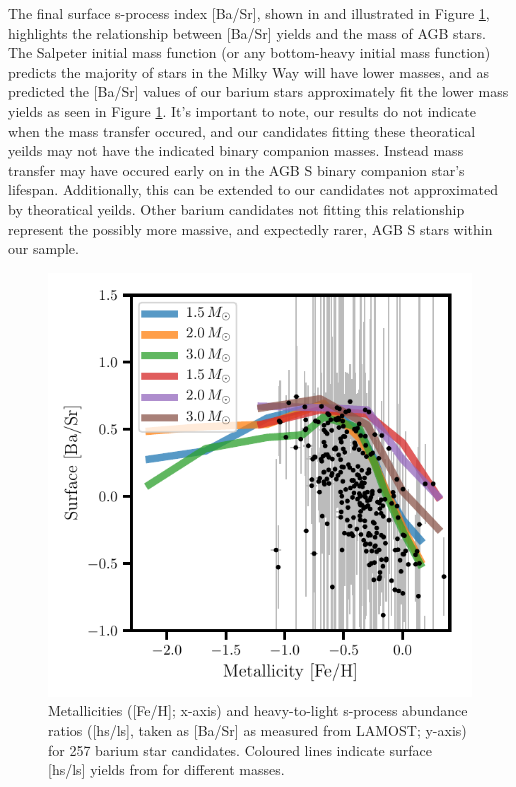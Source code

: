 \documentclass[a4paper,fleqn,usenatbib]{mnras}
\begin{document}
The final surface s-process index [Ba/Sr], shown in \citet{cristallo2015} and \citet{karakas} illustrated in Figure \ref{fig:figure3}, highlights the relationship between [Ba/Sr] yields and the mass of AGB stars. The Salpeter initial mass function (or any bottom-heavy initial mass function) predicts the majority of stars in the Milky Way will have lower masses, and as predicted the [Ba/Sr] values of our barium stars approximately fit the lower mass yields as seen in Figure \ref{fig:figure3}. It's important to note, our results do not indicate when the mass transfer occured, and our candidates fitting these theoratical yeilds may not have the indicated binary companion masses. Instead mass transfer may have occured early on in the AGB S binary companion star's lifespan. Additionally, this can be extended to our candidates not approximated by theoratical yeilds. Other barium candidates not fitting this relationship represent the possibly more massive, and expectedly rarer, AGB S stars within our sample.

\begin{figure}
	\includegraphics[width=\columnwidth]{yields_test.pdf}
    \caption{Metallicities ([Fe/H]; x-axis) and heavy-to-light s-process abundance ratios ([hs/ls], taken as [Ba/Sr] as measured from LAMOST; y-axis) for 257 barium star candidates. Coloured lines indicate surface [hs/ls] yields from \citet{cristallo2015} for different masses.}
    \label{fig:figure3}
\end{figure}
\end{document}

